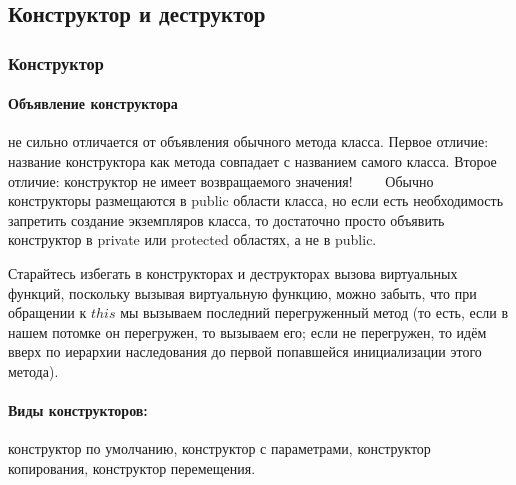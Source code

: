 \subsection{Конструктор и деструктор}

\subsubsection{Конструктор}
\paragraph{Объявление конструктора} не сильно отличается от объявления обычного метода класса. Первое отличие: название конструктора как метода совпадает с названием самого класса. Второе отличие: конструктор не имеет возвращаемого значения!
$\qquad$Обычно конструкторы размещаются в public области класса, но если есть необходимость запретить создание экземпляров класса, то достаточно просто объявить конструктор в private или protected областях, а не в public.
\begin{notice}
    Старайтесь избегать в конструкторах и деструкторах вызова виртуальных функций, поскольку вызывая виртуальную функцию, можно забыть, что при обращении к $this$ мы вызываем последний перегруженный метод (то есть, если в нашем потомке он перегружен, то вызываем его; если не перегружен, то идём вверх по иерархии наследования до первой попавшейся инициализации этого метода).
\end{notice}
\paragraph{Виды конструкторов:} конструктор по умолчанию, конструктор с параметрами, конструктор копирования, конструктор перемещения.

